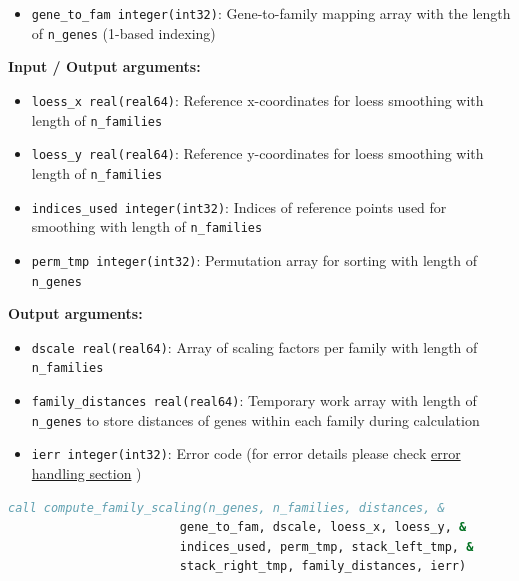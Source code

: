 \documentclass[11pt]{article}
\begin{document}
\begin{enumerate}
\begin{enumerate}
\begin{enumerate}
\begin{itemize}
	      	      	      	\item \texttt{gene\_to\_fam integer(int32)}: Gene-to-family mapping
	      	      	      	      array with the length of \texttt{n\_genes} (1-based indexing)
	      	      	      \end{itemize}
	      	      	      
	      	      	      \textbf{Input / Output arguments:}
	      	      	      \begin{itemize}
	      	      	      	\item \texttt{loess\_x real(real64)}: Reference x-coordinates for
	      	      	      	      loess smoothing with length of \texttt{n\_families}
	      	      	      	      
	      	      	      	\item \texttt{loess\_y real(real64)}: Reference y-coordinates for
	      	      	      	      loess smoothing with length of \texttt{n\_families}
	      	      	      	      
	      	      	      	\item \texttt{indices\_used integer(int32)}: Indices of reference
	      	      	      	      points used for smoothing with length of \texttt{n\_families}
	      	      	      	      
	      	      	      	\item \texttt{perm\_tmp integer(int32)}: Permutation array for sorting
	      	      	      	      with length of \texttt{n\_genes}
	      	      	      \end{itemize}
	      	      	      
	      	      	      \textbf{Output arguments:}
	      	      	      \begin{itemize}
	      	      	      	\item \texttt{dscale real(real64)}: Array of scaling factors per
	      	      	      	      family with length of \texttt{n\_families}
	      	      	      	      
	      	      	      	\item \texttt{family\_distances real(real64)}: Temporary work array
	      	      	      	      with length of \texttt{n\_genes} to store distances of genes
	      	      	      	      within each family during calculation
	      	      	      	      
	      	      	      	\item \texttt{ierr integer(int32)}: Error code (for error
	      	      	      	      details please check
	      	      	      	      \hyperref[sec:error-handling]{error handling section} )
	      	      	      \end{itemize}
	      	      	      \begin{lstlisting}[language=Fortran, caption={Compute Family Scaling}]
call compute_family_scaling(n_genes, n_families, distances, &
                        gene_to_fam, dscale, loess_x, loess_y, &
                        indices_used, perm_tmp, stack_left_tmp, &
                        stack_right_tmp, family_distances, ierr)
	      	      	      \end{lstlisting}
	      	      	      

\end{enumerate}
\end{enumerate}
\end{enumerate}
\end{document}
